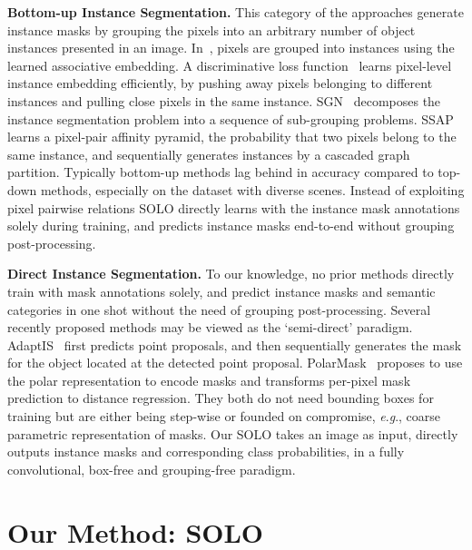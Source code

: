 \documentclass[runningheads]{llncs}
\def\OurMethod{{SOLO}\xspace}
\newcommand{\myparagraph}[1]{{ \noindent \bf #1}}
\newcommand{\eg}{\textit{e}.\textit{g}.}
\begin{document}
\myparagraph{Bottom-up Instance Segmentation.}
This category  of the approaches generate instance masks by grouping the pixels into
an
arbitrary number of object instances presented in an image.
In~\cite{associativeembedding}, pixels are grouped into instances using the learned associative embedding.
A discriminative loss function~\cite{de2017semantic} learns pixel-level instance embedding efficiently, by pushing away pixels belonging to different instances and pulling close pixels in the same instance.
SGN~\cite{SGN17} decomposes the instance segmentation problem into a sequence of sub-grouping problems.
SSAP~\cite{Gao_2019_ICCV} learns a pixel-pair affinity pyramid, the probability that two pixels belong to the same instance, and sequentially generates instances by a cascaded graph partition.
Typically
 bottom-up methods lag behind in accuracy compared to top-down methods, especially on the dataset with diverse scenes.
Instead of exploiting pixel pairwise relations
\OurMethod directly learns with
the instance mask annotations solely during training,
and predicts instance masks
end-to-end without
grouping post-processing.



\myparagraph{Direct Instance Segmentation.}
To
our knowledge, no prior methods directly train with
mask
annotations solely,  and predict instance masks and semantic categories in one shot without the need of grouping post-processing.
Several recently proposed methods may be viewed as the `semi-direct' paradigm.
AdaptIS~\cite{adaptis} first predicts point proposals, and then sequentially generates the mask for the object located at the detected point proposal.
PolarMask~\cite{polarmask} proposes to use the polar representation
to encode masks
and transforms per-pixel mask prediction to distance regression.
They both do not need bounding boxes for training but are either being step-wise or founded on compromise, \eg, coarse parametric representation of masks.
Our \OurMethod takes an image as input, directly outputs instance masks and corresponding class probabilities, in a fully convolutional, box-free and grouping-free paradigm.












\section{Our Method:  \OurMethod}
\end{document}
